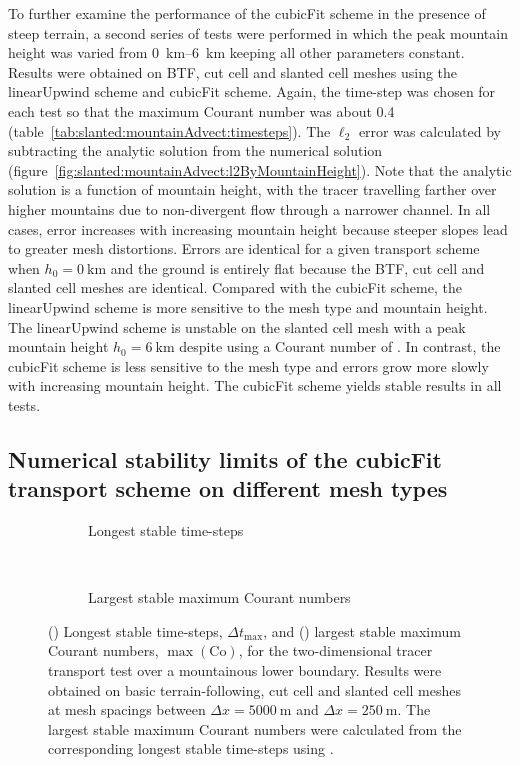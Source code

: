 To further examine the performance of the cubicFit scheme in the presence of steep terrain, a second series of tests were performed in which the peak mountain height was varied from \SIrange{0}{6}{\kilo\meter} keeping all other parameters constant.
Results were obtained on BTF, cut cell and slanted cell meshes using the linearUpwind scheme and cubicFit scheme.  Again, the time-step was chosen for each test so that the maximum Courant number was about \num{0.4} (table~\ref{tab:slanted:mountainAdvect:timesteps}).  The $\ell_2$ error was calculated by subtracting the analytic solution from the numerical solution (figure~\ref{fig:slanted:mountainAdvect:l2ByMountainHeight}).
Note that the analytic solution is a function of mountain height, with the tracer travelling farther over higher mountains due to non-divergent flow through a narrower channel.
In all cases, error increases with increasing mountain height because steeper slopes lead to greater mesh distortions.
Errors are identical for a given transport scheme when $h_0 = \SI{0}{\kilo\meter}$ and the ground is entirely flat because the BTF, cut cell and slanted cell meshes are identical.
Compared with the cubicFit scheme, the linearUpwind scheme is more sensitive to the mesh type and mountain height.  The linearUpwind scheme is unstable on the slanted cell mesh with a peak mountain height $h_0 = \SI{6}{\kilo\meter}$ despite using a Courant number of .
In contrast, the cubicFit scheme is less sensitive to the mesh type and errors grow more slowly with increasing mountain height.  The cubicFit scheme yields stable results in all tests.

\subsection{Numerical stability limits of the cubicFit transport scheme on different mesh types}

\begin{figure}
	\centering
	\begin{subfigure}{\textwidth}
		\caption{Longest stable time-steps}\label{fig:slanted:mountainAdvect:maxdt:dt}
		\TODO{}
	\end{subfigure}
	\\
	\begin{subfigure}{\textwidth}
		\caption{Largest stable maximum Courant numbers}\label{fig:slanted:mountainAdvect:maxdt:co}
		\TODO{}
	\end{subfigure}
	\caption{() Longest stable time-steps, $\Delta t_\mathrm{max}$, and 
	() largest stable maximum Courant numbers, $\max(\mathrm{Co})$, for the two-dimensional tracer transport test over a mountainous lower boundary.  Results were obtained on basic terrain-following, cut cell and slanted cell meshes at mesh spacings between $\Delta x = \SI{5000}{\meter}$ and $\Delta x = \SI{250}{\meter}$.  The largest stable maximum Courant numbers were calculated from the corresponding longest stable time-steps using .}
	\label{fig:slanted:mountainAdvect:maxdt}
\end{figure}

